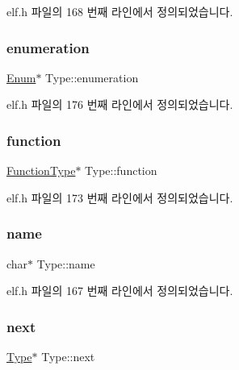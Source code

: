 elf.\+h 파일의 168 번째 라인에서 정의되었습니다.

\mbox{\label{struct_type_ae7e05fc19fc6d70ef0c5c2ee14bfc34f}} 
\subsubsection{\texorpdfstring{enumeration}{enumeration}}
{\footnotesize\ttfamily \mbox{\hyperlink{struct_enum}{Enum}}$\ast$ Type\+::enumeration}



elf.\+h 파일의 176 번째 라인에서 정의되었습니다.

\mbox{\label{struct_type_aeed63343ba804730a8b477a288d3be41}} 
\subsubsection{\texorpdfstring{function}{function}}
{\footnotesize\ttfamily \mbox{\hyperlink{struct_function_type}{Function\+Type}}$\ast$ Type\+::function}



elf.\+h 파일의 173 번째 라인에서 정의되었습니다.

\mbox{\label{struct_type_a40204c03d16be33365f3ebfc8f0efdc6}} 
\subsubsection{\texorpdfstring{name}{name}}
{\footnotesize\ttfamily char$\ast$ Type\+::name}



elf.\+h 파일의 167 번째 라인에서 정의되었습니다.

\mbox{\label{struct_type_ada2a3b3d0180c6958e699fdc870fdbba}} 
\subsubsection{\texorpdfstring{next}{next}}
{\footnotesize\ttfamily \mbox{\hyperlink{struct_type}{Type}}$\ast$ Type\+::next}



